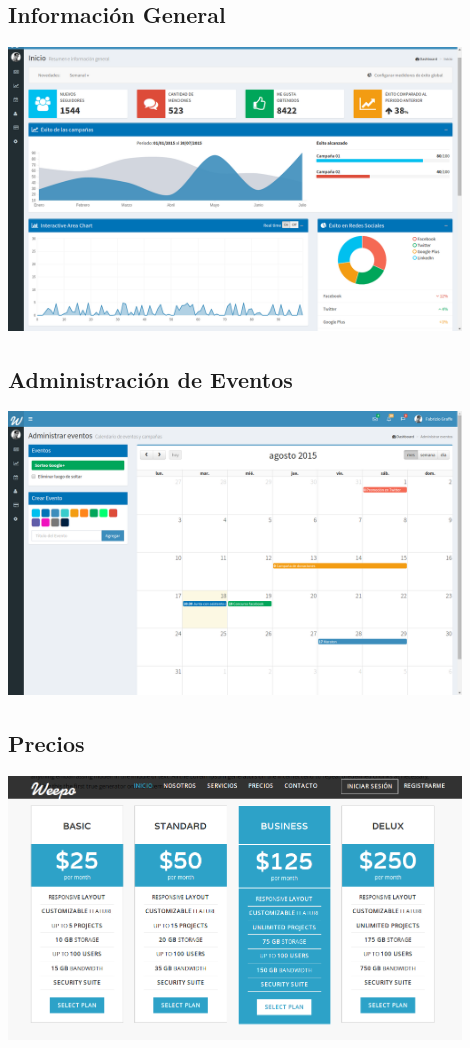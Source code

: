 \documentclass[oneside]{book}
\begin{document}
\medskip
\subsection{Informaci\'{o}n General}

\includegraphics[width=0.9\textwidth]{images/InfoGral.png}

\medskip
\subsection{Administraci\'{o}n de Eventos}

\includegraphics[width=0.9\textwidth]{images/adminEventos.png}

\medskip
\subsection{Precios}

\includegraphics[width=0.9\textwidth]{images/business.png}
\end{document}
